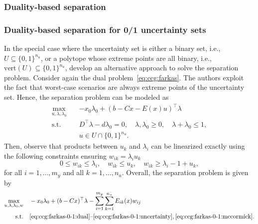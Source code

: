 \subsubsection*{Duality-based separation}


\subsubsection*{Duality-based separation for 0/1 uncertainty sets} 

In the special case where the uncertainty set is either a binary set, i.e., $U
\subseteq \{0,1\}^{n_u}$, or a polytope whose extreme points are all binary,
i.e., $\text{vert}(U) \subseteq \{0,1\}^{n_u}$, \textcite{Ayoub2016} develop
an alternative approach to solve the separation problem. Consider again the
dual problem~\eqref{eq:ccg:farkas}. The authors exploit the fact that
worst-case scenarios are always extreme points of the uncertainty set. Hence,
the separation problem can be modeled as
\begin{subequations}
    \begin{align}
        \max_{u,\lambda,\lambda_0} \quad & -x_0\lambda_0 + (b - Cx - E(x)u)^\top \lambda \\
        \text{s.t.} \quad & D^\top \lambda - d\lambda_0 = 0, \quad \lambda, \lambda_0 \ge 0, \quad \lambda + \lambda_0 \le 1, \label{eq:ccg:farkas-0-1:dual} \\
        & u\in U\cap\{0,1\}^{n_u} \label{eq:ccg:farkas-0-1:uncertainty}.
    \end{align}
\end{subequations}
Then, observe that products between $u_k$ and $\lambda_i$ can be linearized
exactly using the following constraints ensuring $w_{ik} = \lambda_iu_k$
\begin{equation}
    0 \le w_{ik} \le \lambda_i, \quad 
    w_{ik} \le u_k, \quad 
    w_{ik} \ge \lambda_i - 1 + u_k,
    \label{eq:ccg:farkas-0-1:mccormick}
\end{equation}
for all $i=1,\dotsc,m_y$ and all $k = 1,\dotsc,n_u$. Overall, the separation
problem is given by 
\begin{subequations}
    \begin{align*}
        \max_{u,\lambda,\lambda_0,w} \quad & -x_0\lambda_0 + (b - Cx)^\top \lambda - \sum_{i=1}^{m_y} \sum_{k=1}^{n_u} E_{ik}(x)w_{ij} \\
        \text{s.t.} \quad & \text{\eqref{eq:ccg:farkas-0-1:dual}--\eqref{eq:ccg:farkas-0-1:uncertainty}}, \eqref{eq:ccg:farkas-0-1:mccormick}. 
    \end{align*}
\end{subequations}

